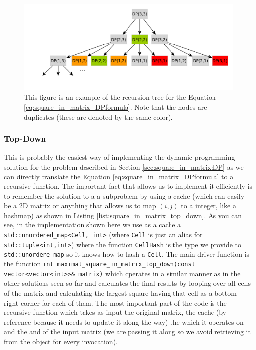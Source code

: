 \begin{figure}
	\centering
	\label{fig:square_in_matrix:recursiontree}
	\includegraphics[width=\textwidth]{sources/square_in_matrix/images/recursiontree}
	\caption{This figure is an example of the recursion tree for the Equation
	\ref{eq:square_in_matrix_DPformula}. Note that the nodes are duplicates (these are denoted by the
	same color). }
\end{figure}

\subsubsection{Top-Down}
\label{sec:square_in_matrix:top_down}
This is probably the easiest way of implementing the dynamic programming solution for the problem
described in Section \ref{sec:square_in_matrix:DP} as we can directly translate the Equation
\ref{eq:square_in_matrix_DPformula} to a recursive function. The important
fact that  allows us to implement it efficiently is to remember the solution
to a a subproblem by using a cache (which can easily be a 2D matrix or anything that allows us to
map $(i,j)$ to a integer, like a hashmap) as shown in Listing
\ref{list:square_in_matrix_top_down}.
As you can see, in the implementation shown here we use as a cache a
\lstinline[columns=fixed]{std::unordered_map<Cell, int>} (where \lstinline[columns=fixed]{Cell} is
just an alias for \lstinline[columns=fixed]{std::tuple<int,int>}) where the function
\lstinline[columns=fixed]{CellHash}
is the type we provide to \lstinline[columns=fixed]{std::unordere_map} so it knows how to hash a
\lstinline[columns=fixed]{Cell}. The main driver function is the function
\lstinline[columns=fixed]{int maximal_square_in_matrix_top_down(const vector<vector<int>>& matrix)}
which operates in a similar manner as in the other solutions seen so far and calculates the final
results by looping over all cells of the matrix and calculating the largest square
having that cell as a bottom-right corner for each of them. The most important part of the code is the recursive
function 
which takes as input the original matrix, the cache (by reference because it
needs to update it along the way) the  which it operates on and
the  and  of the input matrix (we are passing it along
so we avoid retrieving it from the  object for every invocation).

